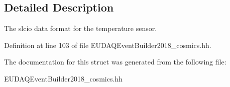 \subsection{Detailed Description}
The slcio data format for the temperature sensor. 

Definition at line 103 of file E\-U\-D\-A\-Q\-Event\-Builder2018\-\_\-cosmics.\-hh.



The documentation for this struct was generated from the following file\-:\begin{DoxyCompactItemize}
\item 
E\-U\-D\-A\-Q\-Event\-Builder2018\-\_\-cosmics.\-hh\end{DoxyCompactItemize}
